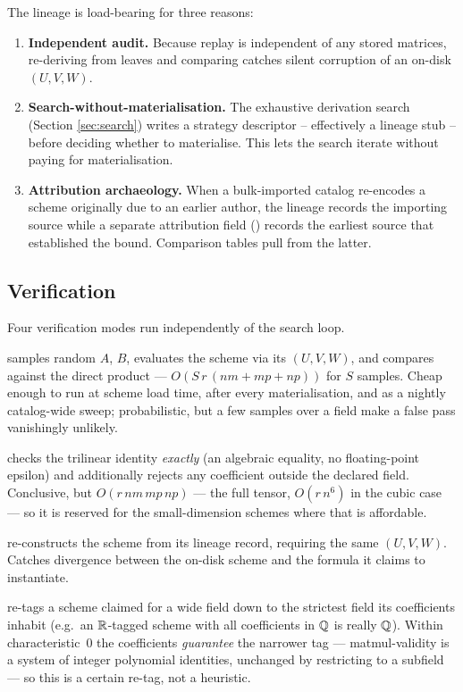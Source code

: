 The lineage is load-bearing for three reasons:
\begin{enumerate}[itemsep=2pt]
  \item \textbf{Independent audit.} Because replay is independent of
    any stored matrices, re-deriving from leaves and comparing catches
    silent corruption of an on-disk \((U, V, W)\).
  \item \textbf{Search-without-materialisation.} The exhaustive derivation
    search (Section \ref{sec:search}) writes a strategy descriptor
    -- effectively a lineage stub -- before deciding whether to
    materialise. This lets the search iterate without paying for
    materialisation.
  \item \textbf{Attribution archaeology.} When a bulk-imported
    catalog re-encodes a scheme originally due to an earlier author,
    the lineage records the importing source while a separate
    attribution field () records the
    earliest source that established the bound. Comparison tables
    pull from the latter.
\end{enumerate}

\subsection{Verification}

Four verification modes run independently of the search loop.
\begin{description}[itemsep=2pt]
  \item[Spot-check.] 
    samples random \(A\), \(B\), evaluates the scheme via its
    \((U, V, W)\), and compares against the direct product ---
    \(O(S\,r\,(nm{+}mp{+}np))\) for \(S\) samples. Cheap enough to run
    at scheme load time, after every materialisation, and as a nightly
    catalog-wide sweep; probabilistic, but a few samples over a field
    make a false pass vanishingly unlikely.
  \item[Symbolic.]  checks the trilinear
    identity \emph{exactly} (an algebraic equality, no floating-point
    epsilon) and additionally rejects any coefficient outside the
    declared field. Conclusive, but \(O(r\,nm\,mp\,np)\) --- the full
    tensor, \(O(r\,n^6)\) in the cubic case --- so it is reserved for
    the small-dimension schemes where that is affordable.
  \item[Lineage replay.]  re-constructs the
    scheme from its lineage record, requiring the same
    \((U, V, W)\). Catches divergence between the on-disk scheme and
    the formula it claims to instantiate.
  \item[Field widening.]  re-tags a scheme
    claimed for a wide field down to the strictest field its
    coefficients inhabit (e.g.\ an \(\mathbb{R}\)-tagged scheme with all
    coefficients in \(\mathbb{Q}\) is really \(\mathbb{Q}\)). Within
    characteristic~0 the coefficients \emph{guarantee} the narrower
    tag --- matmul-validity is a system of integer polynomial
    identities, unchanged by restricting to a subfield --- so this is a
    certain re-tag, not a heuristic.
\end{description}
